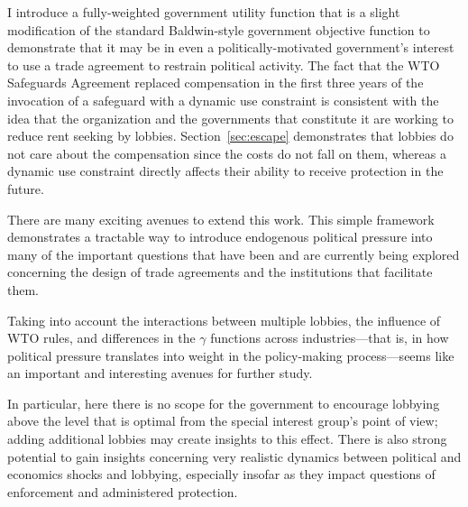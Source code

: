\documentclass[12pt]{article}
\newcommand{\ga}{\gamma}
\begin{document}
I introduce a fully-weighted government utility function that is a slight modification of the standard Baldwin-style government objective function to demonstrate that it may be in even a politically-motivated government's interest to use a trade agreement to restrain political activity. The fact that the WTO Safeguards Agreement replaced compensation in the first three years of the invocation of a safeguard with a dynamic use constraint is consistent with the idea that the organization and the governments that constitute it are working to reduce rent seeking by lobbies. Section~\ref{sec:escape} demonstrates that lobbies do not care about the compensation since the costs do not fall on them, whereas a dynamic use constraint directly affects their ability to receive protection in the future.

There are many exciting avenues to extend this work. This simple framework demonstrates a tractable way to introduce endogenous political pressure into many of the important questions that have been and are currently being explored concerning the design of trade agreements and the institutions that facilitate them.


Taking into account the interactions between multiple lobbies, the influence of WTO rules, and differences in the $\ga$ functions across industries---that is, in how political pressure translates into weight in the policy-making process---seems like an important and interesting avenues for further study.

In particular, here there is no scope for the government to encourage lobbying above the level that is optimal from the special interest group's point of view; adding additional lobbies may create insights to this effect. There is also strong potential to gain insights concerning very realistic dynamics between political and economics shocks and lobbying, especially insofar as they impact questions of enforcement and administered protection.
\end{document}
